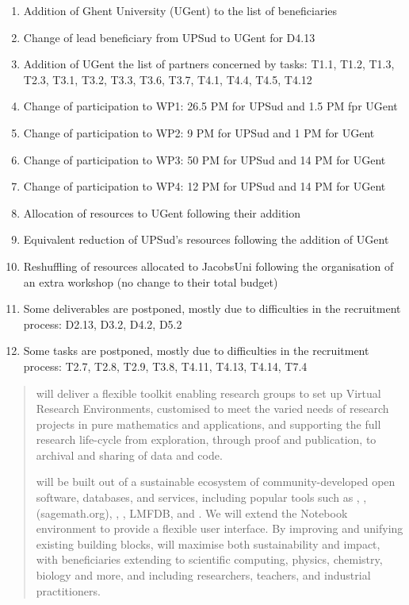 \documentclass[noworkareas,deliverables,\classoptions]{euproposal}       %
\begin{document}
\begin{proposal}
\begin{enumerate}
\item Addition of Ghent University (UGent) to the list of beneficiaries
\item Change of lead beneficiary from UPSud to UGent for D4.13
\item Addition of UGent the list of partners concerned by tasks: T1.1, T1.2, T1.3, T2.3, T3.1, T3.2, T3.3, T3.6, T3.7, T4.1, T4.4, T4.5, T4.12
\item Change of participation to WP1: 26.5 PM for UPSud and 1.5 PM fpr UGent
\item Change of participation to WP2: 9 PM for UPSud and 1 PM for UGent
\item Change of participation to WP3: 50 PM for UPSud and 14 PM for UGent
\item Change of participation to WP4: 12 PM for UPSud and 14 PM for UGent
\item Allocation of resources to UGent following their addition
\item Equivalent reduction of UPSud's resources following the addition of UGent
\item Reshuffling of resources allocated to JacobsUni following the
  organisation of an extra workshop (no change to their total budget)
\item Some deliverables are postponed, mostly due to difficulties in the recruitment process: D2.13, D3.2, D4.2, D5.2
\item Some tasks are postponed, mostly due to difficulties in the recruitment process: T2.7, T2.8, T2.9, T3.8, T4.11, T4.13, T4.14, T7.4
\end{enumerate}
\clearpage
\fi

\else
\begin{abstract}
  \TheProject will deliver  a flexible toolkit enabling
  research groups to set up Virtual Research Environments, customised
  to meet the varied needs of research projects in
  pure mathematics and applications, and supporting the full
  research life-cycle from exploration,
  through proof and publication, to archival and sharing of data and
  code.

  \TheProject will be built out of a sustainable ecosystem of
  community-developed open software, databases, and services,
  including popular tools such as \Linbox, \MPIR, \Sage(sagemath.org),
  \GAP, \PariGP, LMFDB, and \Singular. We will extend the \Jupyter
  Notebook environment to provide a flexible user interface. By
  improving and unifying existing building blocks, \TheProject will
  maximise both sustainability and impact, with beneficiaries
  extending to scientific computing, physics, chemistry, biology and
  more, and including researchers, teachers, and industrial
  practitioners.


\end{abstract}
\end{proposal}
\end{document}
